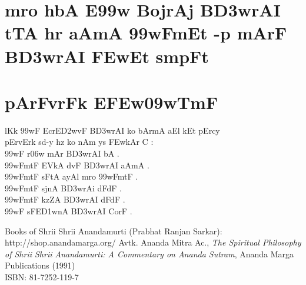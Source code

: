 \documentclass[12pt]{book}
\begin{document}
\frontmatter
%
\chapter*{\large {} }
\thispagestyle{empty}
\section*{\huge {}}
\newpage
%
\chapter*{\center \normalsize  {\dn m\?ro  h\0bA   E\399w BojrAj B\3D3wrAI tTA hr aAmA \399wFmEt -p mArF B\3D3wrAI \3FEwEt smpF{\qvb}t}}
%
%
\mainmatter
%
\chapter{ {\dn pArFvrFk E\3FEw\309wTmF}}
 {\dn l\?Kk \399wF EcrE\3D2wvF B\3D3wrAI ko bAr\?mA aEl kEt pErcy\\
pErvErk sd-y hz ko nAm ys \3FEwkAr C {\rs :\re} \\
\399wF  r\?\306w mAr B\3D3wrAI bA .\\
\399wFmtF EVkA d\?vF B\3D3wrAI aAmA . \\
\399wFmtF sFtA ayA\0l m\?ro \399wFmtF . \\
\399wFmtF sjnA B\3D3wrAi dFdF . \\
\399wFmtF kzZA B\3D3wrAI dFdF . \\
\399wF sFE\3D1wnA B\3D3wrAI CorF . \\
}
%
\backmatter
%
\begin{thebibliography}{99}
Books of Shrii Shrii Anandamurti (Prabhat Ranjan Sarkar): \\
http://shop.anandamarga.org/
Avtk. Ananda Mitra Ac., \emph{The Spiritual Philosophy of Shrii Shrii Anandamurti: A Commentary on Ananda Sutram}, Ananda Marga Publications (1991) \\
ISBN: 81-7252-119-7
\end{thebibliography}
\end{document}
